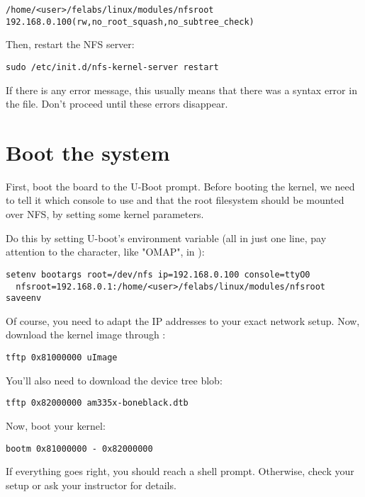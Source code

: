 \scriptsize
\begin{verbatim}
/home/<user>/felabs/linux/modules/nfsroot 192.168.0.100(rw,no_root_squash,no_subtree_check)
\end{verbatim}
\normalsize

Then, restart the NFS server:

\begin{verbatim}
sudo /etc/init.d/nfs-kernel-server restart
\end{verbatim}

If there is any error message, this usually means that there was a
syntax error in the  file. Don't proceed until these
errors disappear.

\section{Boot the system}

First, boot the board to the U-Boot prompt. Before booting the kernel,
we need to tell it which console to use and that the root filesystem
should be mounted over NFS, by setting some kernel parameters.

Do this by setting U-boot's  environment variable (all in
just one line, pay attention to the  character, like "OMAP", in
): 

\begin{verbatim}
setenv bootargs root=/dev/nfs ip=192.168.0.100 console=ttyO0
  nfsroot=192.168.0.1:/home/<user>/felabs/linux/modules/nfsroot
saveenv
\end{verbatim}

Of course, you need to adapt the IP addresses to your exact network
setup. Now, download the kernel image through :

\begin{verbatim}
tftp 0x81000000 uImage
\end{verbatim}

You'll also need to download the device tree blob:

\begin{verbatim}
tftp 0x82000000 am335x-boneblack.dtb
\end{verbatim}

Now, boot your kernel:

\begin{verbatim}
bootm 0x81000000 - 0x82000000
\end{verbatim}

If everything goes right, you should reach a shell prompt. Otherwise,
check your setup or ask your instructor for details.


